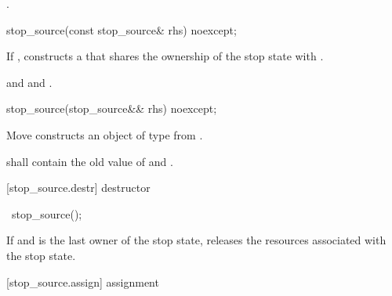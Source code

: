 {\begin{itemdescr}
  \pnum\postconditions {}.
\end{itemdescr}


%
\begin{itemdecl}
stop_source(const stop_source& rhs) noexcept;
\end{itemdecl}
\begin{itemdescr}
  \pnum\effects If ,
                constructs a 
                that shares the ownership of the stop state with .

  \pnum\postconditions {}
                and 
                and .
\end{itemdescr}

%
\begin{itemdecl}
stop_source(stop_source&& rhs) noexcept;
\end{itemdecl}
\begin{itemdescr}
  \pnum\effects Move constructs an object of type  from .

  \pnum\postconditions {} shall contain the old value of  and
                        .
\end{itemdescr}

[stop_source.destr]{ destructor}

%
\begin{itemdecl}
~stop_source();
\end{itemdecl}

\begin{itemdescr}
 \pnum\effects If  and  is the last owner of the stop state,
                releases the resources associated with the stop state.
\end{itemdescr}

[stop_source.assign]{ assignment}

}
